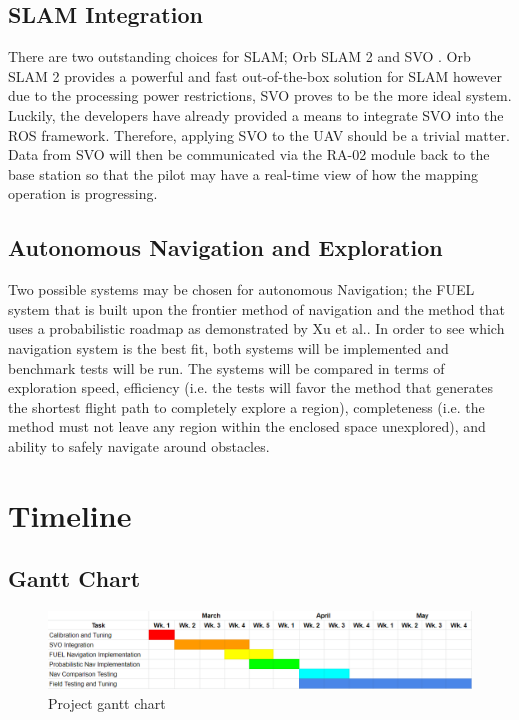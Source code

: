 \documentclass[english]{upeeei}
\begin{document}
\section{SLAM Integration}
There are two outstanding choices for SLAM; Orb SLAM 2 \cite{OrbSlam2} and SVO \cite{SVO2017}. Orb SLAM 2 provides a
powerful and fast out-of-the-box solution for SLAM however due to the processing power restrictions, SVO proves to be the
more ideal system. Luckily, the developers have already provided a means to integrate SVO into the ROS framework.
Therefore, applying SVO to the UAV should be a trivial matter. Data from SVO will then be communicated via the RA-02
module back to the base station so that the pilot may have a real-time view of how the mapping operation is progressing.
\section{Autonomous Navigation and Exploration}
Two possible systems may be chosen for autonomous Navigation; the FUEL system\cite{Fuel2020} that is built
upon the frontier method of navigation and the method that uses a probabilistic roadmap as demonstrated by Xu et al.\cite{ProbNav}.
In order to see which navigation system is the best fit, both systems will be implemented and benchmark tests will be run.
The systems will be compared in terms of exploration speed, efficiency (i.e. the tests will favor the method that generates the
shortest flight path to completely explore a region), completeness (i.e. the method must not leave any region within the
enclosed space unexplored), and ability to safely navigate around obstacles.
\chapter{Timeline}
\section{Gantt Chart}
\begin{figure}[h]
    \centering
    \includegraphics[scale=0.5]{images/gantt_chart.PNG}
    \caption{Project gantt chart}
    \label{fig:gantt_chart}
\end{figure}
\end{document}
